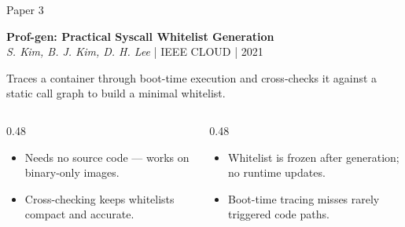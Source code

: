 \documentclass[aspectratio=169,11pt]{beamer}
\begin{document}
\begin{frame}{Paper 3}
\vspace{0.4cm}
\begin{center}
{\Large\bfseries Prof-gen: Practical Syscall Whitelist Generation}\\[0.15cm]
{\small\color{DarkGray}\textit{S. Kim, B. J. Kim, D. H. Lee} | IEEE CLOUD | 2021}
\end{center}

\vspace{0.2cm}
{\small Traces a container through boot-time execution and cross-checks it against a static call graph to build a minimal whitelist.}

\vspace{0.2cm}
\begin{columns}[T,onlytextwidth]
\begin{column}{0.48\textwidth}
\begin{tcolorbox}[colback=green!5,colframe=green!50!black,title={\textcolor{green!50!black}{\faCheckCircle}~Where It Wins},fonttitle=\bfseries\small,boxrule=0.5pt,arc=2mm,left=2mm,right=2mm,top=1mm,bottom=1mm]
\footnotesize
\begin{itemize}
  \item Needs no source code --- works on binary-only images.
  \item Cross-checking keeps whitelists compact and accurate.
\end{itemize}
\end{tcolorbox}
\end{column}

\begin{column}{0.48\textwidth}
\begin{tcolorbox}[colback=red!5,colframe=red!50!black,title={\textcolor{red}{\faTimesCircle}~Where It Struggles},fonttitle=\bfseries\small,boxrule=0.5pt,arc=2mm,left=2mm,right=2mm,top=1mm,bottom=1mm]
\footnotesize
\begin{itemize}
  \item Whitelist is frozen after generation; no runtime updates.
  \item Boot-time tracing misses rarely triggered code paths.
\end{itemize}
\end{tcolorbox}
\end{column}
\end{columns}
\end{frame}
\end{document}
